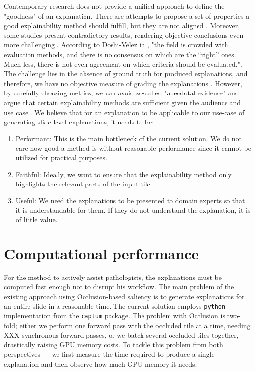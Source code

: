 Contemporary research does not provide a unified approach to define the "goodness" of an explanation.
There are attempts to propose a set of properties a good explainability method should fulfill, but they are not aligned \cite{xai-functionality-grounded, explainability-hard, xai-meta-survey, xai-zhou-survey}.
Moreover, some studies present contradictory results, rendering objective conclusions even more challenging \cite{xai-zhou-survey}.
According to Doshi-Velez in \cite{xai-doshi}, "the field is crowded with evaluation methods, and there is no consensus on which are the “right” ones. 
Much less, there is not even agreement on which criteria should be evaluated.".
The challenge lies in the absence of ground truth for produced explanations, and therefore, we have no objective measure of grading the explanations \cite{xai-zhou-survey}.
However, by carefully choosing metrics, we can avoid so-called "anecdotal evidence" and argue that certain explainability methods are sufficient given the audience and use case \cite{xai-anecdotal-evidence}.
We believe that for an explanation to be applicable to our use-case of generating slide-level explanations, it needs to be:
\begin{enumerate}
    \item Performant: This is the main bottleneck of the current solution. We do not care how good a method is without reasonable performance since it cannot be utilized for practical purposes.
    \item Faithful: Ideally, we want to ensure that the explainability method only highlights the relevant parts of the input tile.
    \item Useful: We need the explanations to be presented to domain experts so that it is understandable for them. If they do not understand the explanation, it is of little value. 
\end{enumerate}

\section{Computational performance}

For the method to actively assist pathologists, the explanations must be computed fast enough not to disrupt his workflow.
The main problem of the existing approach using Occlusion-based saliency is to generate explanations for an entire slide in a reasonable time.
The current solution employs \texttt{python} implementation from the \texttt{captum} package.
The problem with Occlusion is two-fold; either we perform one forward pass with the occluded tile at a time, needing XXX synchronous forward passes, or we batch several occluded tiles together, drastically raising GPU memory costs.
To tackle this problem from both perspectives --- we first measure the time required to produce a single explanation and then observe how much GPU memory it needs.

